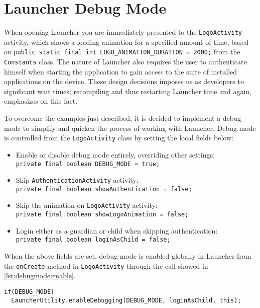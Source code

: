 \section{Launcher Debug Mode}
When opening Launcher you are immediately presented to the \lstinline|LogoActivity| activity, which shows a loading animation for a specified amount of time, based on \lstinline|public static final int LOGO_ANIMATION_DURATION = 2000;| from the \lstinline|Constants| class.
The nature of Launcher also requires the user to authenticate himself when starting the application to gain access to the suite of installed \giraf applications on the device.
These design decisions imposes us as developers to significant wait times; recompiling and thus restarting Launcher time and again, emphasizes on this fact.


To overcome the examples just described, it is decided to implement a debug mode to simplify and quicken the process of working with Launcher.
Debug mode is controlled from the \lstinline|LogoActivity| class by setting the local fields below:

\begin{itemize}
\item Enable or disable debug mode entirely, overriding other settings:\\
\lstinline|private final boolean DEBUG_MODE = true;|
\item Skip \lstinline|AuthenticationActivity| activity:\\
\lstinline|private final boolean showAuthentication = false;|
\item Skip the animation on \lstinline|LogoActivity| activity:\\
\lstinline|private final boolean showLogoAnimation = false;|
\item Login either as a guardian or child when skipping authentication:\\
\lstinline|private final boolean loginAsChild = false;|
\end{itemize}

When the above fields are set, debug mode is enabled globally in Launcher from the \lstinline|onCreate| method in \lstinline|LogoActivity| through the call showed in \cref{lst:debugmode:enable}.

\begin{lstlisting}[caption={Enable debug mode from \lstinline|LogoActivity|.},label={lst:debugmode:enable}]  
if(DEBUG_MODE)
  LauncherUtility.enableDebugging(DEBUG_MODE, loginAsChild, this);
\end{lstlisting}

